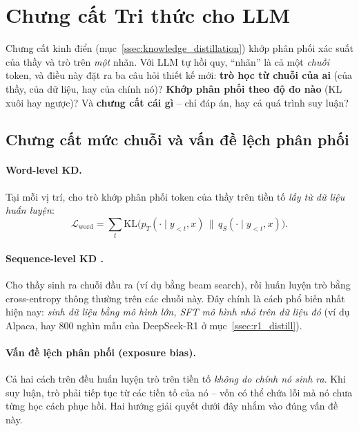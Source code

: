 
\section{Chưng cất Tri thức cho LLM \newtag}
\label{sec:llm_distillation}

Chưng cất kinh điển (mục~\ref{ssec:knowledge_distillation}) khớp phân phối xác suất của thầy và trò trên \emph{một} nhãn. Với LLM tự hồi quy, “nhãn” là cả một \emph{chuỗi} token, và điều này đặt ra ba câu hỏi thiết kế mới: \textbf{trò học từ chuỗi của ai} (của thầy, của dữ liệu, hay của chính nó)? \textbf{Khớp phân phối theo độ đo nào} (KL xuôi hay ngược)? Và \textbf{chưng cất cái gì} -- chỉ đáp án, hay cả quá trình suy luận?

\subsection{Chưng cất mức chuỗi và vấn đề lệch phân phối}
\label{ssec:seq_kd}
\paragraph{Word-level KD.} Tại mỗi vị trí, cho trò khớp phân phối token của thầy trên tiền tố \emph{lấy từ dữ liệu huấn luyện}:
\[
\mathcal{L}_{\text{word}} = \sum_{t} \text{KL}\Big(p_T(\cdot\mid y_{<t}, x)\,\Big\|\, q_S(\cdot\mid y_{<t}, x)\Big).
\]
\paragraph{Sequence-level KD \cite{kim2016sequence}.} Cho thầy sinh ra chuỗi đầu ra (ví dụ bằng beam search), rồi huấn luyện trò bằng cross-entropy thông thường trên các chuỗi này. Đây chính là cách phổ biến nhất hiện nay: \emph{sinh dữ liệu bằng mô hình lớn, SFT mô hình nhỏ trên dữ liệu đó} (ví dụ Alpaca, hay 800 nghìn mẫu của DeepSeek-R1 ở mục~\ref{ssec:r1_distill}).

\paragraph{Vấn đề lệch phân phối (exposure bias).} Cả hai cách trên đều huấn luyện trò trên tiền tố \emph{không do chính nó sinh ra}. Khi suy luận, trò phải tiếp tục từ các tiền tố của nó -- vốn có thể chứa lỗi mà nó chưa từng học cách phục hồi. Hai hướng giải quyết dưới đây nhắm vào đúng vấn đề này.

